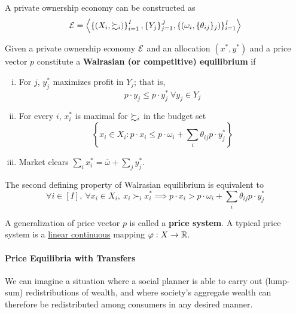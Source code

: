 \documentclass{report}
\begin{document}
		\begin{remark}
			A private ownership economy can be constructed as
			\begin{equation}
				\mathcal{{E}} = \left \langle
					\left \{ (X_i, \succsim_i) \right \}_{i=1}^I,
					\{Y_j\}_{j=1}^J,
					\{(\omega_i, \{\theta_{ij}\}_j)\}_{i=1}^I
				\right \rangle
			\end{equation}
		\end{remark}
		
		\begin{definition}[16.B.3]
			Given a private ownership economy $\mathcal{{E}}$ and an allocation $(x^*, y^*)$ and a price vector $p$ constitute a \textbf{Walrasian (or competitive) equilibrium} if
			\begin{enumerate}[(i)]
				\item For $j$, $y_j^*$ maximizes profit in $Y_j$; that is,
				\begin{equation}
					p \cdot y_j \leq p \cdot y_j^*\ \forall y_j \in Y_j
				\end{equation}
				\item For every $i$, $x_i^*$ is maximal for $\succsim_i$ in the budget set
				\begin{equation}
					\left\{
					x_i \in X_i: p \cdot x_i \leq p \cdot \omega_i + \sum_i \theta_{ij} p \cdot y_j^*
					\right\}
				\end{equation}
				\item Market clears $\sum_i x_i^* = \overline{\omega} + \sum_j y_j^*$.
			\end{enumerate}
		\end{definition}
		
		\begin{remark}
			The second defining property of Walrasian equilibrium is equivalent to 
			\begin{equation}
				\forall i \in [I],\ \forall x_i \in X_i,\ x_i \succ_i x_i^* \implies p \cdot x_i > p \cdot \omega_i + \sum_i \theta_{ij} p \cdot y_j^*
			\end{equation}
		\end{remark}
		
		\begin{definition}
			A generalization of price vector $p$ is called a \textbf{price system}. A typical price system is a \ul{linear continuous} mapping $\varphi: X \to \mathbb{R}$.
		\end{definition}
		
		\paragraph{Price Equilibria with Transfers} We can imagine a situation where a social planner is able to carry out (lump-sum) redistributions of wealth, and where society's aggregate wealth can therefore be redistributed among consumers in any desired manner.
		
\end{document}
